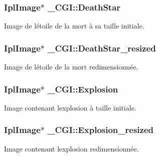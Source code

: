 \subsubsection[{\texorpdfstring{Death\+Star}{DeathStar}}]{\setlength{\rightskip}{0pt plus 5cm}Ipl\+Image$\ast$ \+\_\+\+C\+G\+I\+::\+Death\+Star}\hypertarget{struct___c_g_i_aa1d4c570026afbeb752de156cb115353}{}\label{struct___c_g_i_aa1d4c570026afbeb752de156cb115353}
Image de l\textquotesingle{}étoile de la mort à sa taille initiale. 
\subsubsection[{\texorpdfstring{Death\+Star\+\_\+resized}{DeathStar_resized}}]{\setlength{\rightskip}{0pt plus 5cm}Ipl\+Image$\ast$ \+\_\+\+C\+G\+I\+::\+Death\+Star\+\_\+resized}\hypertarget{struct___c_g_i_af452815aee153641ee47cd414ff40084}{}\label{struct___c_g_i_af452815aee153641ee47cd414ff40084}
Image de l\textquotesingle{}étoile de la mort redimensionnée. 
\subsubsection[{\texorpdfstring{Explosion}{Explosion}}]{\setlength{\rightskip}{0pt plus 5cm}Ipl\+Image$\ast$ \+\_\+\+C\+G\+I\+::\+Explosion}\hypertarget{struct___c_g_i_a8512e1bcfb9f357ebad1faf094229032}{}\label{struct___c_g_i_a8512e1bcfb9f357ebad1faf094229032}
Image contenant l\textquotesingle{}explosion à taille initiale. 
\subsubsection[{\texorpdfstring{Explosion\+\_\+resized}{Explosion_resized}}]{\setlength{\rightskip}{0pt plus 5cm}Ipl\+Image$\ast$ \+\_\+\+C\+G\+I\+::\+Explosion\+\_\+resized}\hypertarget{struct___c_g_i_ab35e9d17dbad69caeecb0d0eb448870c}{}\label{struct___c_g_i_ab35e9d17dbad69caeecb0d0eb448870c}
Image contenant l\textquotesingle{}explosion redimensionnée. 
